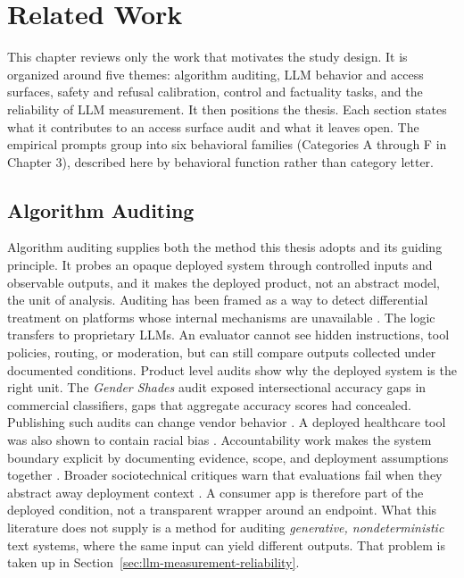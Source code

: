 \chapter{Related Work}

This chapter reviews only the work that motivates the study design. It is
organized around five themes: algorithm auditing, LLM behavior and access
surfaces, safety and refusal calibration, control and factuality tasks, and the
reliability of LLM measurement. It then positions the thesis. Each section states
what it contributes to an access surface audit and what it leaves open. The
empirical prompts group into six behavioral families (Categories A through F in
Chapter 3), described here by behavioral function rather than category letter.

\section{Algorithm Auditing}

Algorithm auditing supplies both the method this thesis adopts and its guiding
principle. It probes an opaque deployed system through controlled inputs and
observable outputs, and it makes the deployed product, not an abstract model, the
unit of analysis. Auditing has been framed as a way to detect differential
treatment on platforms whose internal mechanisms are unavailable
\parencite{sandvig_auditing}. The logic transfers to proprietary LLMs. An
evaluator cannot see hidden instructions, tool policies, routing, or moderation,
but can still compare outputs collected under documented conditions. Product
level audits show why the
deployed system is the right unit. The \emph{Gender Shades} audit
\parencite{gender_shades} exposed intersectional accuracy gaps in commercial
classifiers, gaps that aggregate accuracy scores had concealed. Publishing such audits can change
vendor behavior \parencite{raji_actionable}. A deployed healthcare tool was also
shown to contain racial bias \parencite{obermeyer_bias}. Accountability work
makes the system boundary explicit by documenting evidence, scope, and deployment
assumptions together \parencite{raji_gap}. Broader sociotechnical critiques warn
that evaluations fail when they abstract away deployment context
\parencite{selbst_abstraction,suresh_guttag}. A consumer app is therefore part of the deployed
condition, not a transparent wrapper around an endpoint. What this literature does
not supply is a method for auditing \emph{generative, nondeterministic} text
systems, where the same input can yield different outputs. That problem is taken
up in Section~\ref{sec:llm-measurement-reliability}.


